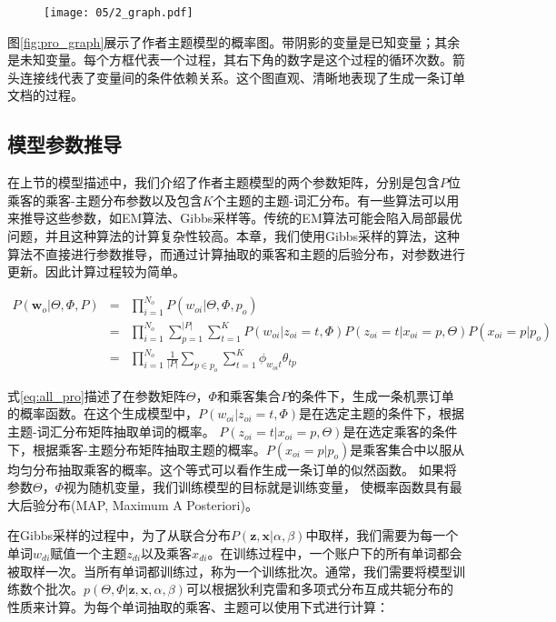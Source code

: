 \begin{figure}[!h]
 \centering
 \texttt{[image: 05/2\_graph.pdf]}
\end{figure}

图\ref{fig:pro_graph}展示了作者主题模型的概率图。带阴影的变量是已知变量；其余是未知变量。每个方框代表一个过程，其右下角的数字是这个过程的循环次数。箭头连接线代表了变量间的条件依赖关系。这个图直观、清晰地表现了生成一条订单文档的过程。

\subsection{模型参数推导}
在上节的模型描述中，我们介绍了作者主题模型的两个参数矩阵，分别是包含$P$位乘客的乘客-主题分布参数以及包含$K$个主题的主题-词汇分布。有一些算法可以用来推导这些参数，如EM算法、Gibbs采样\cite{george1993variable}等。传统的EM算法可能会陷入局部最优问题，并且这种算法的计算复杂性较高。本章，我们使用Gibbs采样的算法，这种算法不直接进行参数推导，而通过计算抽取的乘客和主题的后验分布，对参数进行更新。因此计算过程较为简单。


\begin{eqnarray}
\label{eq:all_pro}
P(\mathbf{w}_o | \Theta,\Phi,P) & = & \prod_{i=1}^{N_o}P(w_{oi}|\Theta,\Phi,p_o) 
\nonumber \\
 & = & \prod_{i=1}^{N_o}\sum_{p=1}^{|P|}\sum_{t=1}^{K}P(w_{oi}|z_{oi}=t,\Phi)
P(z_{oi}=t|x_{oi}=p,\Theta)P(x_{oi}=p|p_o) \nonumber \\
 & = & \prod_{i=1}^{N_o}\frac{1}{|P|}\sum_{p \in p_o}\sum_{t=1}^{K}\phi_{w_{oi}t}\theta_{tp}
\end{eqnarray}


式\ref{eq:all_pro}描述了在参数矩阵$\Theta$，$\Phi$和乘客集合$P$的条件下，生成一条机票订单的概率函数。在这个生成模型中，$P(w_{oi}|z_{oi}=t,\Phi)$是在选定主题的条件下，根据主题-词汇分布矩阵抽取单词的概率。
$P(z_{oi}=t|x_{oi}=p,\Theta)$是在选定乘客的条件下，根据乘客-主题分布矩阵抽取主题的概率。$P(x_{oi}=p|p_o)$是乘客集合中以服从均匀分布抽取乘客的概率。这个等式可以看作生成一条订单的似然函数。
如果将参数$\Theta$，$\Phi$视为随机变量，我们训练模型的目标就是训练变量，
使概率函数具有最大后验分布(MAP, Maximum A Posteriori)。 

在Gibbs采样的过程中，为了从联合分布$P(\mathbf{z},\mathbf{x}|\alpha,\beta)$中取样，我们需要为每一个单词$w_{di}$赋值一个主题$z_{di}$以及乘客$x_{di}$。在训练过程中，一个账户下的所有单词都会被取样一次。当所有单词都训练过，称为一个训练批次。通常，我们需要将模型训练数个批次。$p(\Theta,\Phi|\mathbf{z},\mathbf{x},\alpha,\beta)$可以根据狄利克雷和多项式分布互成共轭分布的性质来计算。为每个单词抽取的乘客、主题可以使用下式进行计算：

